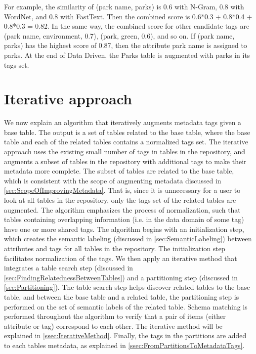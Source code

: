 For example, the similarity of (park name, parks) is 0.6 with N-Gram, 0.8 with WordNet, and 0.8 with FastText. Then the combined score is 0.6*0.3 + 0.8*0.4 + 0.8*0.3 = 0.82. In the same way, the combined score for other candidate tags are (park name, environment, 0.7), (park, green, 0.6), and so on. If (park name, parks) has the highest score of 0.87, then the attribute park name is assigned to parks. At the end of Data Driven, the Parks table is augmented with parks in its tags set.

\section{Iterative approach}
\label{sec:IterativeApproach}

We now explain an algorithm that iteratively augments metadata tags given a base table. The output is a set of tables related to the base table, where the base table and each of the related tables contains a normalized tags set. The iterative approach uses the existing small number of tags in tables in the repository, and augments a subset of tables in the repository with additional tags to make their metadata more complete. The subset of tables are related to the base table, which is consistent with the scope of augmenting metadata discussed in \autoref{sec:ScopeOfImprovingMetadata}. That is, since it is unnecessary for a user to look at all tables in the repository, only the tags set of the related tables are augmented. The algorithm emphasizes the process of normalization, such that tables containing overlapping information (i.e. in the data domain of some tag) have one or more shared tags.
The algorithm begins with an initialization step, which creates the semantic labeling (discussed in \autoref{sec:SemanticLabeling}) between attributes and tags for all tables in the repository. The initialization step facilitates normalization of the tags. We then apply an iterative method that integrates a table search step (discussed in \autoref{sec:FindingRelatednessBetweenTables}) and a partitioning step (discussed in \autoref{sec:Partitioning}). The table search step helps discover related tables to the base table, and between the base table and a related table, the partitioning step is performed on the set of semantic labels of the related table. Schema matching is performed throughout the algorithm to verify that a pair of items (either attribute or tag) correspond to each other. The iterative method will be explained in \autoref{ssec:IterativeMethod}. Finally, the tags in the partitions are added to each tables metadata, as explained in \autoref{ssec:FromPartitionsToMetadataTags}.

